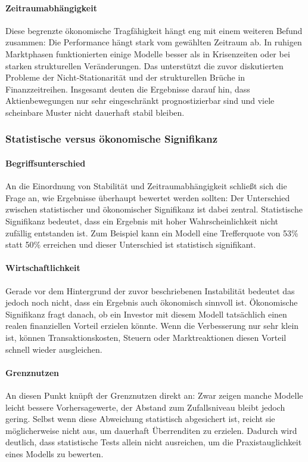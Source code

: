 \paragraph{Zeitraumabhängigkeit}
Diese begrenzte ökonomische Tragfähigkeit hängt eng mit einem weiteren Befund zusammen: Die Performance hängt stark vom gewählten Zeitraum ab. In ruhigen Marktphasen funktionierten einige Modelle besser als in Krisenzeiten oder bei starken strukturellen Veränderungen. Das unterstützt die zuvor diskutierten Probleme der Nicht-Stationarität und der strukturellen Brüche in Finanzzeitreihen. Insgesamt deuten die Ergebnisse darauf hin, dass Aktienbewegungen nur sehr eingeschränkt prognostizierbar sind und viele scheinbare Muster nicht dauerhaft stabil bleiben.

\subsubsection{Statistische versus ökonomische Signifikanz}
\paragraph{Begriffsunterschied}
An die Einordnung von Stabilität und Zeitraumabhängigkeit schließt sich die Frage an, wie Ergebnisse überhaupt bewertet werden sollten: Der Unterschied zwischen statistischer und ökonomischer Signifikanz ist dabei zentral. Statistische Signifikanz bedeutet, dass ein Ergebnis mit hoher Wahrscheinlichkeit nicht zufällig entstanden ist. Zum Beispiel kann ein Modell eine Trefferquote von 53\% statt 50\% erreichen und dieser Unterschied ist statistisch signifikant.
\paragraph{Wirtschaftlichkeit}
Gerade vor dem Hintergrund der zuvor beschriebenen Instabilität bedeutet das jedoch noch nicht, dass ein Ergebnis auch ökonomisch sinnvoll ist. Ökonomische Signifikanz fragt danach, ob ein Investor mit diesem Modell tatsächlich einen realen finanziellen Vorteil erzielen könnte. Wenn die Verbesserung nur sehr klein ist, können Transaktionskosten, Steuern oder Marktreaktionen diesen Vorteil schnell wieder ausgleichen.
\paragraph{Grenznutzen}
An diesen Punkt knüpft der Grenznutzen direkt an: Zwar zeigen manche Modelle leicht bessere Vorhersagewerte, der Abstand zum Zufallsniveau bleibt jedoch gering. Selbst wenn diese Abweichung statistisch abgesichert ist, reicht sie möglicherweise nicht aus, um dauerhaft Überrenditen zu erzielen. Dadurch wird deutlich, dass statistische Tests allein nicht ausreichen, um die Praxistauglichkeit eines Modells zu bewerten.
